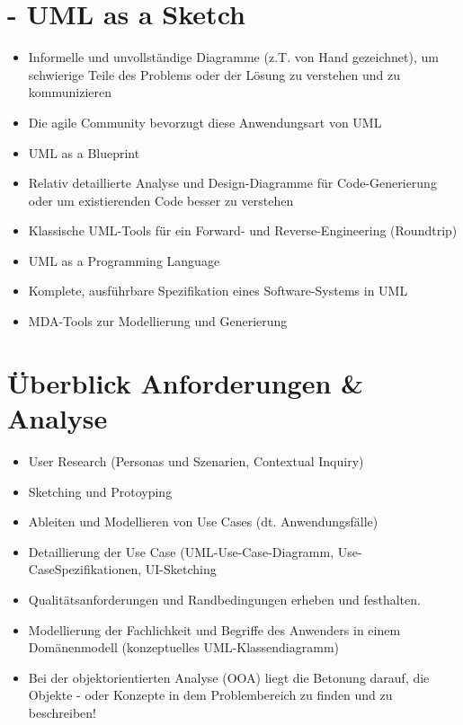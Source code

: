 \documentclass[10pt]{article}
\begin{document}
\section*{- UML as a Sketch}
\begin{itemize}
  \item Informelle und unvollständige Diagramme (z.T. von Hand gezeichnet), um schwierige Teile des Problems oder der Lösung zu verstehen und zu kommunizieren
  \item Die agile Community bevorzugt diese Anwendungsart von UML
  \item UML as a Blueprint
  \item Relativ detaillierte Analyse und Design-Diagramme für Code-Generierung oder um existierenden Code besser zu verstehen
  \item Klassische UML-Tools für ein Forward- und Reverse-Engineering (Roundtrip)
  \item UML as a Programming Language
  \item Komplete, ausführbare Spezifikation eines Software-Systems in UML
  \item MDA-Tools zur Modellierung und Generierung
\end{itemize}

\section*{Überblick Anforderungen \& Analyse}
\begin{itemize}
  \item User Research (Personas und Szenarien, Contextual Inquiry)
  \item Sketching und Protoyping
  \item Ableiten und Modellieren von Use Cases (dt. Anwendungsfälle)
  \item Detaillierung der Use Case (UML-Use-Case-Diagramm, Use-CaseSpezifikationen, UI-Sketching
  \item Qualitätsanforderungen und Randbedingungen erheben und festhalten.
  \item Modellierung der Fachlichkeit und Begriffe des Anwenders in einem Domänenmodell (konzeptuelles UML-Klassendiagramm)
  \item Bei der objektorientierten Analyse (OOA) liegt die Betonung darauf, die Objekte - oder Konzepte in dem Problembereich zu finden und zu beschreiben!
\end{itemize}
\end{document}
